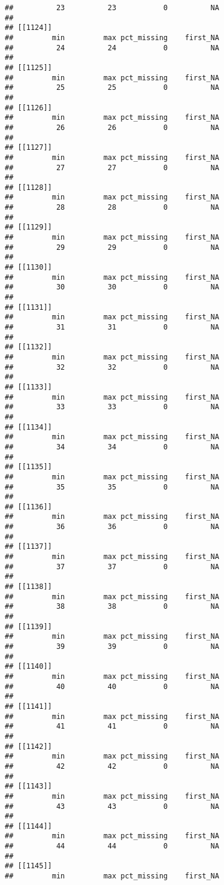\documentclass[
]{article}
\begin{document}
\begin{verbatim}
##          23          23           0          NA 
## 
## [[1124]]
##         min         max pct_missing    first_NA 
##          24          24           0          NA 
## 
## [[1125]]
##         min         max pct_missing    first_NA 
##          25          25           0          NA 
## 
## [[1126]]
##         min         max pct_missing    first_NA 
##          26          26           0          NA 
## 
## [[1127]]
##         min         max pct_missing    first_NA 
##          27          27           0          NA 
## 
## [[1128]]
##         min         max pct_missing    first_NA 
##          28          28           0          NA 
## 
## [[1129]]
##         min         max pct_missing    first_NA 
##          29          29           0          NA 
## 
## [[1130]]
##         min         max pct_missing    first_NA 
##          30          30           0          NA 
## 
## [[1131]]
##         min         max pct_missing    first_NA 
##          31          31           0          NA 
## 
## [[1132]]
##         min         max pct_missing    first_NA 
##          32          32           0          NA 
## 
## [[1133]]
##         min         max pct_missing    first_NA 
##          33          33           0          NA 
## 
## [[1134]]
##         min         max pct_missing    first_NA 
##          34          34           0          NA 
## 
## [[1135]]
##         min         max pct_missing    first_NA 
##          35          35           0          NA 
## 
## [[1136]]
##         min         max pct_missing    first_NA 
##          36          36           0          NA 
## 
## [[1137]]
##         min         max pct_missing    first_NA 
##          37          37           0          NA 
## 
## [[1138]]
##         min         max pct_missing    first_NA 
##          38          38           0          NA 
## 
## [[1139]]
##         min         max pct_missing    first_NA 
##          39          39           0          NA 
## 
## [[1140]]
##         min         max pct_missing    first_NA 
##          40          40           0          NA 
## 
## [[1141]]
##         min         max pct_missing    first_NA 
##          41          41           0          NA 
## 
## [[1142]]
##         min         max pct_missing    first_NA 
##          42          42           0          NA 
## 
## [[1143]]
##         min         max pct_missing    first_NA 
##          43          43           0          NA 
## 
## [[1144]]
##         min         max pct_missing    first_NA 
##          44          44           0          NA 
## 
## [[1145]]
##         min         max pct_missing    first_NA 

\end{verbatim}
\end{document}
